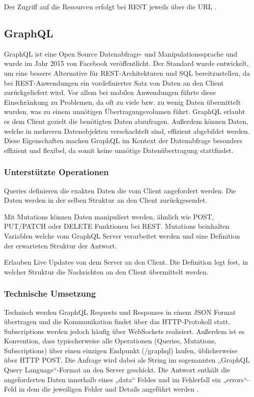 Der Zugriff auf die Resourcen erfolgt bei REST jeweils über die URL \parencite{rfc9110}.


\subsection{GraphQL}
GraphQL ist eine Open Source Datenabfrage- und Manipulationssprache und wurde im Jahr 2015 von Facebook veröffentlicht.
Der Standard wurde entwickelt, um eine bessere Alternative für REST-Architekturen und SQL bereitzustellen, da bei REST-Anwendungen ein vordefinierter Satz von Daten an den Client  zurückgeliefert wird. Vor allem bei mobilen Anwendungen führte diese Einschränkung zu Problemen, da oft zu viele bzw. zu wenig Daten übermittelt wurden, was zu einem unnötigen Übertragungsvolumen führt.
GraphQL erlaubt es dem Client gezielt die benötigten Daten abzufragen. Außerdem können Daten, welche in mehreren Datenobjekten verschachtelt sind, effizient abgebildet werden. Diese Eigenschaften machen GraphQL im Kontext der Datenabfrage besonders effizient und flexibel, da somit keine unnötige Datenübertragung stattfindet. 

\subsubsection*{Unterstützte Operationen}

\begin{description}[leftmargin=2cm, style=nextline]
	\item[Queries (schreibend):]  
	Queries definieren die exakten Daten die vom Client angefordert werden. Die Daten werden in der selben Struktur an den Client zurückgesendet. 
	
	\item[Mutations (manipulierend): ]  
	Mit Mutations können Daten manipuliert werden, ähnlich wie POST, PUT/PATCH oder DELETE Funktionen bei REST. Mutations beinhalten Variablen welche vom GraphQL Server verarbeitet werden und eine Definition der erwarteten Struktur der Antwort.
	
	\item[Subscriptions:]  
	Erlauben Live Updates von dem Server an den Client. Die Definition legt fest, in welcher Struktur die Nachrichten an den Client übermittelt werden.
\end{description}

\subsubsection*{Technische Umsetzung}
Technisch werden GraphQL Requests und Responses in einem JSON Format übertragen und die Kommunikation findet über das HTTP-Protokoll statt. Subscriptions werden jedoch häufig über WebSockets realisiert. Außerdem ist es Konvention, dass typischerweise alle Operationen (Queries, Mutations, Subscriptions) über einen einzigen Endpunkt (/graphql) laufen, üblicherweise über HTTP POST. 
Die Anfrage wird dabei als String im sogenannten „GraphQL Query Language“-Format an den Server geschickt. Die Antwort enthält die angeforderten Daten innerhalb eines „data“ Feldes und im Fehlerfall ein „errors“-Feld in dem die jeweiligen Fehler und Details angeführt werden \parencite{graphql-org}.


